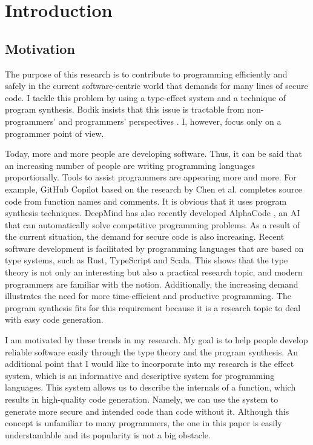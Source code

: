 \documentclass[12pt, a4paper, titlepage]{report}
\begin{document}
\chapter{Introduction}\label{chapter:introduction}
 
  \section{Motivation}
    The purpose of this research is to contribute to programming efficiently and safely in the current software-centric world that demands for many lines of secure code.
    I tackle this problem by using a type-effect system and a technique of program synthesis.
    Bodik insists that this issue is tractable from non-programmers' and programmers' perspectives \cite{bodik:2015}.
    I, however, focus only on a programmer point of view.

    Today, more and more people are developing software.
    Thus, it can be said that an increasing number of people are writing programming languages proportionally.
    Tools to assist programmers are appearing more and more.
    For example, GitHub Copilot based on the research by Chen et al. \cite{Chen:2021} completes source code from function names and comments.
    It is obvious that it uses program synthesis techniques.
    DeepMind has also recently developed AlphaCode \cite{Li:2022}, an AI that can automatically solve competitive programming problems.
    As a result of the current situation, the demand for secure code is also increasing.
    Recent software development is facilitated by programming languages that are based on type systems, such as Rust, TypeScript and Scala.
    This shows that the type theory is not only an interesting but also a practical research topic, and modern programmers are familiar with the notion.
    Additionally, the increasing demand illustrates the need for more time-efficient and productive programming.
    The program synthesis fits for this requirement because it is a research topic to deal with easy code generation.

    I am motivated by these trends in my research.
    My goal is to help people develop reliable software easily through the type theory and the program synthesis.
    An additional point that I would like to incorporate into my research is the effect system, which is an informative and descriptive system for programming languages.
    This system allows us to describe the internals of a function, which results in high-quality code generation.
    Namely, we can use the system to generate more secure and intended code than code without it.
    Although this concept is unfamiliar to many programmers, the one in this paper is easily understandable and its popularity is not a big obstacle.
\end{document}
